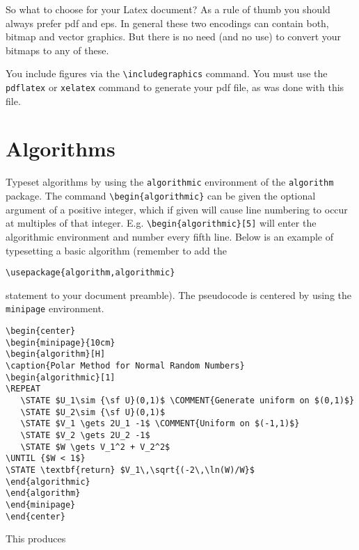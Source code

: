 \documentclass[a4paper,11pt]{article}
\theoremstyle{plain}
\theoremstyle{definition}
\begin{document}
So what to choose for your Latex document? As a rule of thumb you should
always prefer pdf and eps. In general these two encodings can contain both,
bitmap and vector graphics. But there is no need (and no use) to convert
your bitmaps to any of these.

You include figures via the \verb+\includegraphics+ command.
You must use the \texttt{pdflatex} or \texttt{xelatex} command to generate
your pdf file, as was done with this file.

\section{Algorithms}
Typeset algorithms by using the \texttt{algorithmic} environment of the
\texttt{algorithm} package.
The command \verb+\begin{algorithmic}+ can be given the optional argument of a
positive integer, which if given will cause line numbering to occur at multiples
of that integer. E.g. \verb+\begin{algorithmic}[5]+ will enter the algorithmic
environment and number every fifth line. Below is an example of typesetting a
basic algorithm (remember to add the

\verb+\usepackage{algorithm,algorithmic}+

\noindent
statement to your document preamble). The pseudocode is centered by using the
\texttt{minipage} environment.

{\small
\begin{verbatim}
\begin{center}
\begin{minipage}{10cm}
\begin{algorithm}[H]
\caption{Polar Method for Normal Random Numbers}
\begin{algorithmic}[1]
\REPEAT
   \STATE $U_1\sim {\sf U}(0,1)$ \COMMENT{Generate uniform on $(0,1)$}
   \STATE $U_2\sim {\sf U}(0,1)$
   \STATE $V_1 \gets 2U_1 -1$ \COMMENT{Uniform on $(-1,1)$}
   \STATE $V_2 \gets 2U_2 -1$
   \STATE $W \gets V_1^2 + V_2^2$
\UNTIL {$W < 1$}
\STATE \textbf{return} $V_1\,\sqrt{(-2\,\ln(W)/W}$
\end{algorithmic}
\end{algorithm}
\end{minipage}
\end{center}
\end{verbatim}
}

\noindent
This produces
\end{document}

